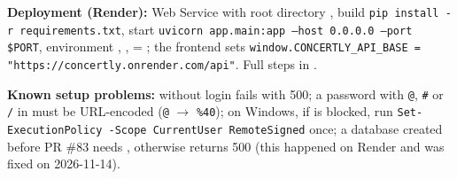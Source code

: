 \documentclass[11pt,a4paper]{article}
\newcommand{\code}[1]{\begingroup\let\codeus\_\renewcommand{\_}{\codeus\allowbreak}\texttt{#1}\endgroup}
\begin{document}
\textbf{Deployment (Render):} Web Service with root directory , build
\code{pip install -r requirements.\allowbreak{}txt}, start \code{uvicorn app.\allowbreak{}main:app --host 0.0.0.0 --port \$PORT},
environment , ,  =
; the frontend sets
\code{window.\allowbreak{}CONCERTLY\_API\_BASE = "https:/\allowbreak{}/\allowbreak{}concertly.\allowbreak{}onrender.\allowbreak{}com/\allowbreak{}api"}. Full steps in .

\textbf{Known setup problems:} without  login fails with 500; a password with
\code{@}, \code{\#} or \code{/\allowbreak{}} in  must be URL-encoded (\code{@} $\to$ \code{\%40});
on Windows, if  is blocked, run \code{Set-ExecutionPolicy -Scope CurrentUser RemoteSigned} once;
a database created before PR \#83 needs , otherwise
 returns 500 (this happened on Render and was fixed on 2026-11-14).


\end{document}
